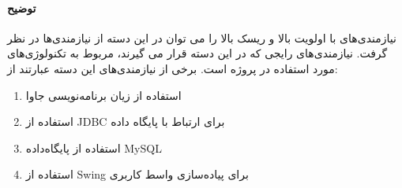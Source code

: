 \paragraph{توضیح}
نیازمندی‌های با اولویت بالا و ریسک بالا را می توان در این دسته از نیازمندی‌ها در نظر گرفت. نیازمندی‌های رایجی که در این دسته قرار می گیرند، مربوط به تکنولوژی‌های مورد استفاده در پروژه است. برخی از نیازمندی‌های این دسته عبارتند از:
\begin{enumerate}
	
	\item استفاده از زیان برنامه‌نویسی جاوا
	\item استفاده از JDBC برای ارتباط با پایگاه داده
	\item استفاده از پایگاه‌داده MySQL
	\item استفاده از Swing برای پیاده‌سازی واسط کاربری

\end{enumerate}